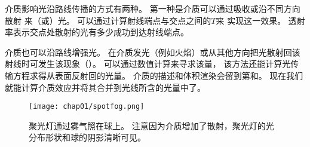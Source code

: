 介质影响光沿路线传播的方式有两种。
第一种是介质可以通过吸收或沿不同方向散射
来（或）光。
可以通过计算射线端点与交点之间的$T$来
实现这一效果。
透射率表示交点处散射的光有多少成功到达射线端点。

介质也可以沿路线增强光。
在介质发光（例如火焰）或从其他方向把光散射回该射线时可发生该现象（）。
可以通过数值计算来寻求该量，
该方法还能计算光传输方程求得从表面反射回的光量。
介质的描述和体积渲染会留到第和。
现在我们就能计算介质效应并将其合并到光线所含的光量中了。
\begin{figure}
      \centering
      \texttt{[image: chap01/spotfog.png]}
      \caption{聚光灯通过雾气照在球上。
            注意因为介质增加了散射，聚光灯的光分布形状和球的阴影清晰可见。}
      \label{fig:1.10}
\end{figure}